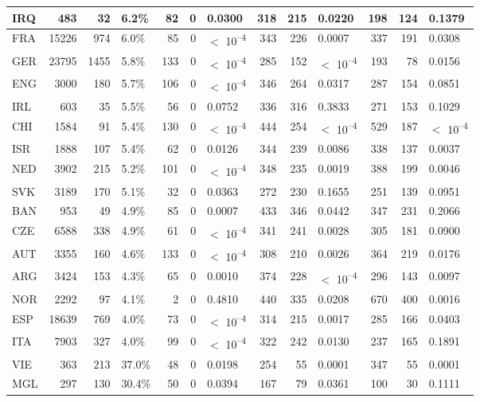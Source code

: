 \begin{tabular}{l|r|r|l|r|r|l|r|r|l|r|r|l}
\hline
IRQ & 483 & 32 & 6.2\% & 82 & 0 & 0.0300 & 318 & 215 & 0.0220 & 198 & 124 & 0.1379\\
\hline
FRA & 15226 & 974 & 6.0\% & 85 & 0 & $<$ 10\textsuperscript{--4} & 343 & 226 & 0.0007 & 337 & 191 & 0.0308\\
\hline
GER & 23795 & 1455 & 5.8\% & 133 & 0 & $<$ 10\textsuperscript{--4} & 285 & 152 & $<$ 10\textsuperscript{--4} & 193 & 78 & 0.0156\\
\hline
ENG & 3000 & 180 & 5.7\% & 106 & 0 & $<$ 10\textsuperscript{--4} & 346 & 264 & 0.0317 & 287 & 154 & 0.0851\\
\hline
IRL & 603 & 35 & 5.5\% & 56 & 0 & 0.0752 & 336 & 316 & 0.3833 & 271 & 153 & 0.1029\\
\hline
CHI & 1584 & 91 & 5.4\% & 130 & 0 & $<$ 10\textsuperscript{--4} & 444 & 254 & $<$ 10\textsuperscript{--4} & 529 & 187 & $<$ 10\textsuperscript{--4}\\
\hline
ISR & 1888 & 107 & 5.4\% & 62 & 0 & 0.0126 & 344 & 239 & 0.0086 & 338 & 137 & 0.0037\\
\hline
NED & 3902 & 215 & 5.2\% & 101 & 0 & $<$ 10\textsuperscript{--4} & 348 & 235 & 0.0019 & 388 & 199 & 0.0046\\
\hline
SVK & 3189 & 170 & 5.1\% & 32 & 0 & 0.0363 & 272 & 230 & 0.1655 & 251 & 139 & 0.0951\\
\hline
BAN & 953 & 49 & 4.9\% & 85 & 0 & 0.0007 & 433 & 346 & 0.0442 & 347 & 231 & 0.2066\\
\hline
CZE & 6588 & 338 & 4.9\% & 61 & 0 & $<$ 10\textsuperscript{--4} & 341 & 241 & 0.0028 & 305 & 181 & 0.0900\\
\hline
AUT & 3355 & 160 & 4.6\% & 133 & 0 & $<$ 10\textsuperscript{--4} & 308 & 210 & 0.0026 & 364 & 219 & 0.0176\\
\hline
ARG & 3424 & 153 & 4.3\% & 65 & 0 & 0.0010 & 374 & 228 & $<$ 10\textsuperscript{--4} & 296 & 143 & 0.0097\\
\hline
NOR & 2292 & 97 & 4.1\% & 2 & 0 & 0.4810 & 440 & 335 & 0.0208 & 670 & 400 & 0.0016\\
\hline
ESP & 18639 & 769 & 4.0\% & 73 & 0 & $<$ 10\textsuperscript{--4} & 314 & 215 & 0.0017 & 285 & 166 & 0.0403\\
\hline
ITA & 7903 & 327 & 4.0\% & 99 & 0 & $<$ 10\textsuperscript{--4} & 322 & 242 & 0.0130 & 237 & 165 & 0.1891\\
\hline
VIE & 363 & 213 & 37.0\% & 48 & 0 & 0.0198 & 254 & 55 & 0.0001 & 347 & 55 & 0.0001\\
\hline
MGL & 297 & 130 & 30.4\% & 50 & 0 & 0.0394 & 167 & 79 & 0.0361 & 100 & 30 & 0.1111\\

\end{tabular}
